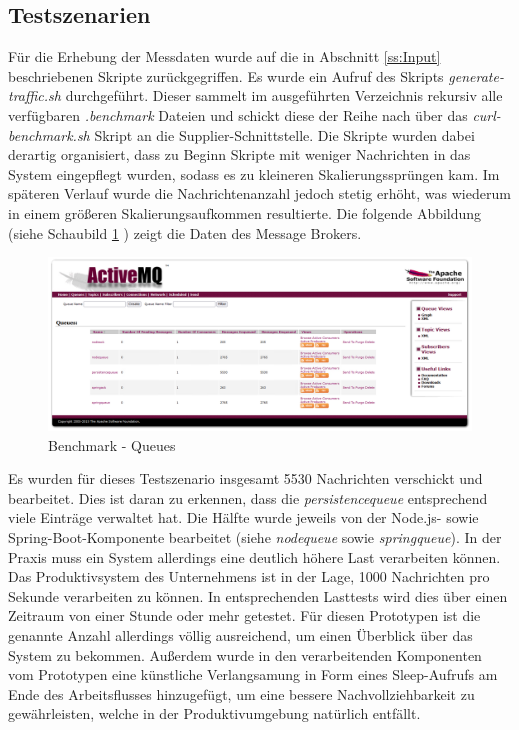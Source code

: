 \subsection{Testszenarien}
Für die Erhebung der Messdaten wurde auf die in Abschnitt \ref{ss:Input} beschriebenen Skripte zurückgegriffen. Es wurde ein Aufruf des Skripts \emph{generate-traffic.sh} durchgeführt. Dieser sammelt im ausgeführten Verzeichnis rekursiv alle verfügbaren \emph{.benchmark} Dateien und schickt diese der Reihe nach über das \emph{curl-benchmark.sh} Skript an die Supplier-Schnittstelle. Die Skripte wurden dabei derartig organisiert, dass zu Beginn Skripte mit weniger Nachrichten in das System eingepflegt wurden, sodass es zu kleineren Skalierungssprüngen kam. Im späteren Verlauf wurde die Nachrichtenanzahl jedoch stetig erhöht, was wiederum in einem größeren Skalierungsaufkommen resultierte. Die folgende Abbildung (siehe Schaubild \ref{fig:benchmarkQueues} ) zeigt die Daten des Message Brokers. 

\begin{figure}[ht!]
	\centering
	\includegraphics[width=\linewidth]{kapitel/problemloesung/implementierung/_img/benchmark-queues}
	\caption[Benchmark - Queues]{Benchmark - Queues}
	\label{fig:benchmarkQueues}
\end{figure}

Es wurden für dieses Testszenario insgesamt 5530 Nachrichten verschickt und bearbeitet. Dies ist daran zu erkennen, dass die \emph{persistencequeue} entsprechend viele Einträge verwaltet hat. Die Hälfte wurde jeweils von der Node.js- sowie Spring-Boot-Komponente bearbeitet (siehe \emph{nodequeue} sowie \emph{springqueue}). In der Praxis muss ein System allerdings eine deutlich höhere Last verarbeiten können. Das Produktivsystem des Unternehmens ist in der Lage, 1000 Nachrichten pro Sekunde verarbeiten zu können. In entsprechenden Lasttests wird dies über einen Zeitraum von einer Stunde oder mehr getestet. Für diesen Prototypen ist die genannte Anzahl allerdings völlig ausreichend, um einen Überblick über das System zu bekommen. Außerdem wurde in den verarbeitenden Komponenten vom Prototypen eine künstliche Verlangsamung in Form eines Sleep-Aufrufs am Ende des Arbeitsflusses hinzugefügt, um eine bessere Nachvollziehbarkeit zu gewährleisten, welche in der Produktivumgebung natürlich entfällt.


